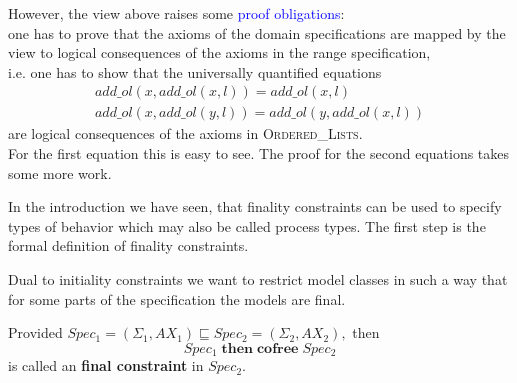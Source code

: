 \documentclass[landscape, autoslides, light]{mmiss}
\begin{document}
\begin{Package}[Label={FSDPT}, Title={Formal Specification of Data and Process Types}, ShortTitle={FSDPT}, Authors={Horst Reichel}, Date={February 2003}, LevelOfDetail=Lecture, Language=en-GB]
\begin{Section}[Title={Initial Algebras as Data Types}, Label={section3}]
\begin{Section}[Title={Data Refinement}, Label={section3_6}]
\begin{Paragraph}[Label=Paragraph86]
 However, the view above raises some \textcolor{blue}{proof obligations}:
 \pause \\ one has to
prove that the axioms of the domain specifications are mapped by
the view to logical consequences of the axioms in the range
specification, \pause \\ i.e. one has to show that the universally
quantified equations
$$\begin{array}{l}
 add\_ol(x, add\_ol(x,l)) = add\_ol(x,l) \\
 add\_ol(x, add\_ol(y,l)) = add\_ol(y, add\_ol(x,l)) \end{array}$$
are logical consequences of the axioms in
\textsc{Ordered\_Lists}.\pause \\ For the first equation this is
easy to see. The proof for the second equations takes some more
work.


\end{Paragraph}
\end{Section}
\end{Section}
\begin{Section}[Title={Final Coalgebras as Process Types}, Label={section4}]

In the introduction we have seen, that finality constraints can be
used to specify types of behavior which may also be called process
types. The first step is the formal definition of finality
constraints.

\begin{Section}[Title={Final Constraints}, Label={section4_1}]
\begin{Paragraph}

Dual to initiality constraints we want to restrict model classes
in such a way that for some parts of the specification the models
are final.\pause

\begin{Definition}[Title = {Final Coalgebras as Process Types}, Label = {Definition4}]
Provided $Spec_1 = (\Sigma_1, AX_1) \sqsubseteq Spec_2 =
(\Sigma_2, AX_2),$ then
$$Spec_1 \; \mathbf{then \;cofree} \; Spec_2 $$ is called an
\textbf{final constraint} in $Spec_2$.
\end{Definition}

\end{Paragraph}
\begin{Paragraph}[Title={Final Constraints}, Label=Paragraph87]


\end{Paragraph}
\end{Section}
\end{Section}
\end{Package}
\end{document}

